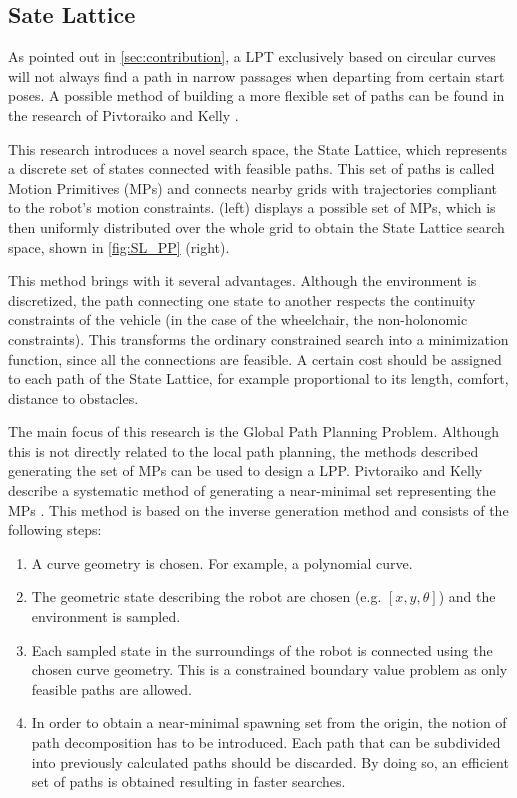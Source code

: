 \subsection{Sate Lattice} \label{sec:SLreview}
As pointed out in \cref{sec:contribution}, a LPT exclusively based on circular curves will not always find a path in narrow passages when departing from certain start poses. A possible method of building a more flexible set of paths can be found in the research of Pivtoraiko and Kelly \cite{PivtoraikoKelly2005,PivtoraikoEtAl2009,PivtoraikoKelly2012}.

This research introduces a novel search space, the State Lattice, which represents a discrete set of states connected with feasible paths. This set of paths is called Motion Primitives (MPs) and connects nearby grids with trajectories compliant to the robot's motion constraints.  (left) displays a possible set of MPs, which is then uniformly distributed over the whole grid to obtain the State Lattice search space, shown in \cref{fig:SL_PP} (right).

This method brings with it several advantages. Although the environment is discretized, the path connecting one state to another respects the continuity constraints of the vehicle (in the case of the wheelchair, the non-holonomic constraints). This transforms the ordinary constrained search into a minimization function, since all the connections are feasible. A certain cost should be assigned to each path of the State Lattice, for example proportional to its length, comfort, distance to obstacles.

The main focus of this research is the Global Path Planning Problem. Although this is not directly related to the local path planning, the methods described generating the set of MPs can be used to design a LPP. Pivtoraiko and Kelly describe a systematic method of generating a near-minimal set representing the MPs \cite{PivtoraikoKelly2005}. This method is based on the inverse generation method and consists of the following steps: 
\vspace{1em}
\begin{enumerate}
\item A curve geometry is chosen. For example, a polynomial curve.
\item The geometric state describing the robot are chosen (e.g. $[x,y,\theta]$) and the environment is sampled.
\item Each sampled state in the surroundings of the robot is connected using the chosen curve geometry. This is a constrained boundary value problem as only feasible paths are allowed.
\item In order to obtain a near-minimal spawning set from the origin, the notion of path decomposition has to be introduced. Each path that can be subdivided into previously calculated paths should be discarded. By doing so, an efficient set of paths is obtained resulting in faster searches.
\end{enumerate}

